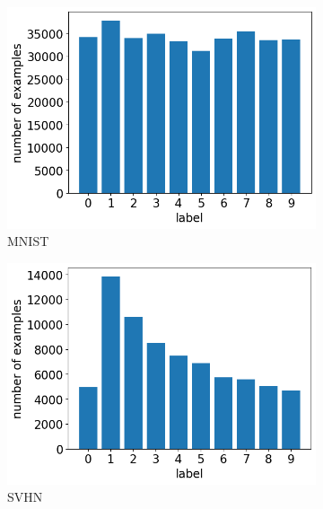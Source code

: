 \begin{figure}[tb]
	\centering
	\begin{subfigure}{0.32\textwidth}
		\centering
		\includegraphics[width=\textwidth]{Bilder/emnist_label_distribution.png}
		\caption{MNIST}
	\end{subfigure}
	\begin{subfigure}{0.32\textwidth}
		\centering
		\includegraphics[width=\textwidth]{Bilder/svhn_label_distribution.png}
		\caption{SVHN}
	\end{subfigure}
	\begin{subfigure}{0.32\textwidth}
		\centering

\end{subfigure}
\end{figure}
